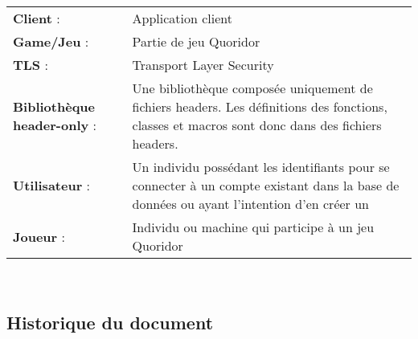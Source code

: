 \documentclass[french, utf8]{article}
\begin{document}
\begin{center}
\begin{tabular}{p{5cm} p{10cm}}
    \textbf{Client} : & Application client \\
    \textbf{Game/Jeu} : & Partie de jeu Quoridor \\
    \textbf{TLS} : & Transport Layer Security \\
    \textbf{Bibliothèque header-only} : & Une bibliothèque composée uniquement de fichiers headers. Les définitions des fonctions, classes et macros sont donc dans des fichiers headers. \\
    \textbf{Utilisateur} : & Un individu possédant les identifiants pour se connecter à un compte existant dans la base de données ou ayant l'intention d'en créer un \\
    \textbf{Joueur} : & Individu ou machine qui participe à un jeu Quoridor\\

\end{tabular}\\
\end{center}
\subsection{Historique du document}
\end{document}

